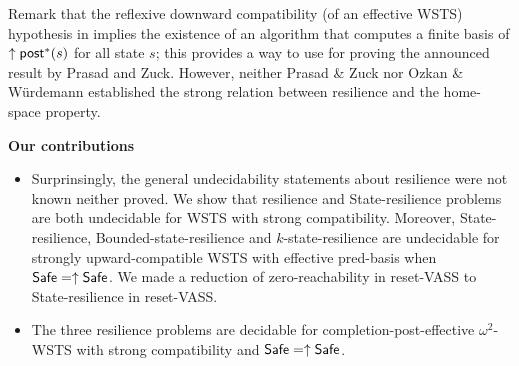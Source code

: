 Remark that the reflexive downward compatibility (of an effective WSTS) hypothesis in  \cite{DBLP:journals/corr/PrasadZ16} implies the existence of an algorithm that computes a finite basis of $\uparrow \textsf{post}^*(s)$ for all state $s$; this provides a way to use \cite{DBLP:journals/corr/abs-2108-00889} for proving the announced result by Prasad and Zuck.
However, neither Prasad \& Zuck nor Ozkan \& Würdemann established the strong relation between resilience and the home-space property.
%






\noindent
{\bf Our contributions}
\begin{itemize}

\item Surprinsingly, the general undecidability statements about resilience were not known neither proved. We show that resilience and {\sc State-resilience} problems are both undecidable for WSTS with strong compatibility. 
Moreover, {\sc State-resilience},
{\sc Bounded-state-resilience} and
{\sc $k$-state-resilience}
are undecidable for strongly upward-compatible WSTS with effective pred-basis
when
$\textsf{Safe}=\uparrow \textsf{Safe}$. We made a reduction of zero-reachability in reset-VASS to {\sc State-resilience} in reset-VASS.


\item The three resilience problems are decidable for completion-post-effective $\omega^2$-WSTS with strong compatibility and $\textsf{Safe} = \uparrow \textsf{Safe}$.


\end{itemize}
